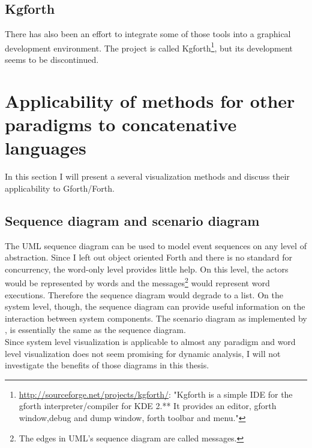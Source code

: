 \subsection*{Kgforth}

There has also been an effort to integrate some of those tools into a graphical development environment. The project is called Kgforth\footnote{\url{http://sourceforge.net/projects/kgforth/}: "Kgforth is a simple IDE for the gforth interpreter/compiler for KDE 2.** 
It provides an editor, gforth window,debug and dump window, forth toolbar and menu."}, but its development seems to be discontinued.

\section{Applicability of methods for other paradigms to concatenative languages}

In this section I will present a several visualization methods and discuss their applicability to Gforth/Forth. 

\subsection*{Sequence diagram and scenario diagram}

The \gls{UML} sequence diagram can be used to model event sequences on any level of abstraction. Since I left out object oriented Forth and there is no standard for concurrency, the word-only level provides little help. On this level, the actors would be represented by words and the messages\footnote{The edges in UML's sequence diagram are called messages.} would represent word executions. Therefore the sequence diagram would degrade to a list. On the system level, though, the sequence diagram can provide useful information on the interaction between system components. The scenario diagram as implemented by \cite{Koskimies:1996:SUS:871313}, is essentially the same as the sequence diagram.
\\
Since system level visualization is applicable to almost any paradigm and word level visualization does not seem promising for dynamic analysis, I will not investigate the benefits of those diagrams in this thesis.

